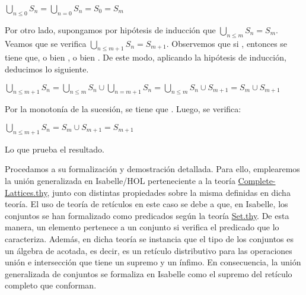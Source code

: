 \begin{isabellebody}
\begin{isamarkuptext}
\begin{demostracion}
  $\bigcup_{n \leq 0} S_{n} = \bigcup_{n = 0} S_{n} = S_{0} = S_{m}$

  Por otro lado, supongamos por hipótesis de inducción que $\bigcup_{n \leq m} S_{n} = S_{m}$.
  Veamos que se verifica $\bigcup_{n \leq m + 1} S_{n} = S_{m + 1}$. Observemos que si ,
  entonces se tiene que, o bien , o bien . De este modo, aplicando la 
  hipótesis de inducción, deducimos lo siguiente.

  $\bigcup_{n \leq m + 1} S_{n} = \bigcup_{n \leq m} S_{n} \cup \bigcup_{n = m + 1} S_{n} = \bigcup_{n \leq m} S_{n} \cup S_{m + 1} = S_{m} \cup S_{m + 1}$

  Por la monotonía de la sucesión, se tiene que . Luego, se verifica:

  $\bigcup_{n \leq m + 1} S_{n} = S_{m} \cup S_{m + 1} = S_{m + 1}$

  Lo que prueba el resultado.
\end{demostracion}

  Procedamos a su formalización y demostración detallada. Para ello, emplearemos la unión 
  generalizada en Isabelle/HOL perteneciente a la teoría 
  \href{https://n9.cl/gtf5x}{Complete-Lattices.thy}, junto con distintas propiedades sobre la misma
  definidas en dicha teoría. El uso de teoría de retículos en este caso se debe a que, en Isabelle,
  los conjuntos se han formalizado como predicados según la teoría 
  \href{https://bit.ly/3ibCuje}{Set.thy}. De esta manera, un elemento pertenece a un conjunto si 
  verifica el predicado que lo caracteriza. Además, en dicha teoría se instancia que el tipo de los 
  conjuntos es un álgebra de  acotada, es decir, es un retículo distributivo para las 
  operaciones unión e intersección que tiene un supremo y un ínfimo. En consecuencia, la unión 
  generalizada de conjuntos se formaliza en Isabelle como el supremo del retículo completo que 
  conforman.


\end{isamarkuptext}
\end{isabellebody}
